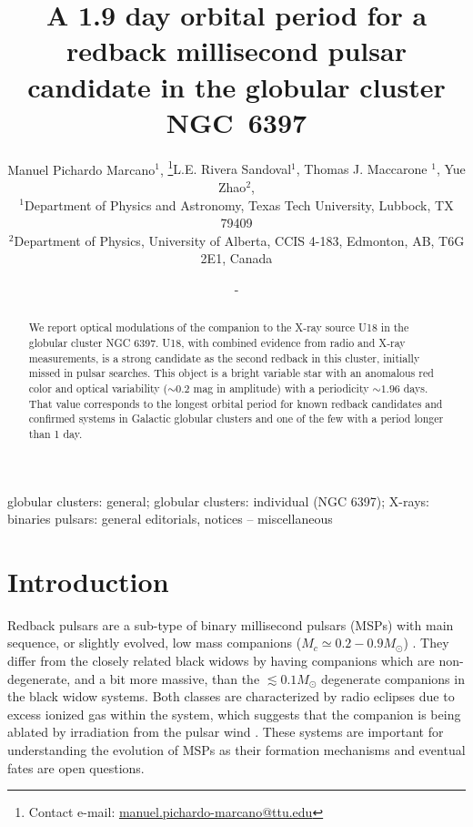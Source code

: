 \documentclass[fleqn,usenatbib,useAMS,letters]{mnras}
\title[A 1.9 day orbital period for a redback MSP Candidate in the Globular Cluster NGC~6397]{A 1.9 day orbital period for a redback millisecond pulsar candidate in the globular cluster NGC~6397}
\author[Manuel Pichardo Marcano, other]{Manuel Pichardo Marcano$^{1}$, \thanks{Contact e-mail: \href{manuel.pichardo-marcano@ttu.edu}{manuel.pichardo-marcano@ttu.edu}}{L.E. Rivera Sandoval$^{1}$, Thomas J.  Maccarone $^{1}$, Yue Zhao$^{2}$, }
\newauthor{Craig O. Heinke$^{2}$}%
\\
$^{1}$Department of Physics and Astronomy, Texas Tech University, Lubbock, TX 79409\\
$^{2}$Department of Physics, University of Alberta, CCIS 4-183, Edmonton, AB, T6G 2E1, Canada}
\date{-}
\begin{document}
\label{firstpage}
\pagerange{\pageref{firstpage}--\pageref{lastpage}}
\maketitle

\begin{abstract}
We report optical modulations of the companion to the %
X-ray source 
U18 in the globular cluster NGC 6397. U18, with combined evidence from radio and X-ray measurements, is a strong candidate as the second redback in this cluster, initially missed in pulsar searches. This object is a bright variable star with an anomalous red color and optical variability ($\sim0.2$ mag in amplitude) with a periodicity $\sim 1.96$ days.  That value corresponds to the longest orbital period for known redback candidates and confirmed systems in Galactic globular clusters and one of the few with a period longer than 1 day. 
\end{abstract}

\begin{keywords}
globular clusters: general; globular clusters: individual (NGC 6397); X-rays: binaries pulsars: general
editorials, notices -- miscellaneous
\end{keywords}




\section{Introduction}

Redback pulsars are a sub-type of binary millisecond pulsars (MSPs) with main sequence, or slightly evolved, low mass companions ($M_{c} \simeq 0.2 - 0.9 M_\odot$) \citep{MalloryRedback2013}. They differ from the closely related black widows by having companions which are non-degenerate, and a bit more massive, than the $\lesssim0.1 M_\odot$  degenerate companions in the black widow systems. Both classes are characterized by radio eclipses due to excess ionized gas within the system, which suggests that the companion is being ablated by irradiation from the pulsar wind \citep{FruchterEclipse1988,Fruchter88b}. These systems are important for understanding the evolution of MSPs as their formation mechanisms and eventual fates are open questions.
\end{document}
